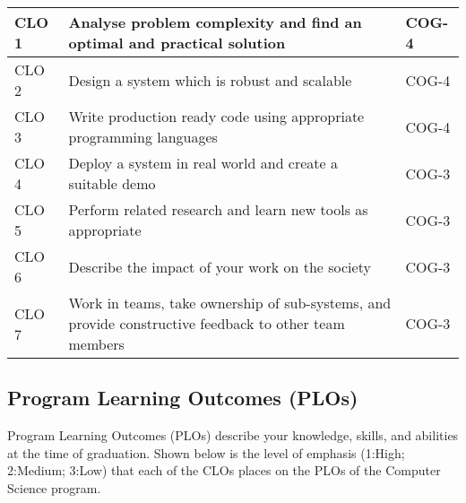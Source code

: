 \documentclass[a4paper]{article}
\newcommand{\new}[1]{{#1}}
\begin{document}
\noindent
\begin{tabularx}{\textwidth}{|l|X|l|}
\hline
CLO 1 & Analyse problem complexity and find an optimal and practical solution & COG-4 \\\hline
CLO 2 & Design a system which is robust and scalable & COG-4\\\hline
CLO 3 & Write production ready code using appropriate programming languages & COG-4\\\hline
CLO 4 & Deploy a system in real world and create a suitable demo & COG-3\\\hline
CLO 5 & Perform related research and learn new tools as appropriate & COG-3\\\hline
CLO 6 & Describe the impact of your work on the society & COG-3\\\hline
CLO 7 & Work in teams, take ownership of sub-systems, and provide constructive feedback to other team members & COG-3\\\hline
\end{tabularx}

\subsection{Program Learning Outcomes (PLOs) }

\new{Program Learning Outcomes (PLOs) describe your knowledge, skills, and abilities at the time of graduation. Shown below is the level of emphasis (1:High; 2:Medium; 3:Low) that each of the CLOs places on the PLOs of the Computer Science program.}
\end{document}
